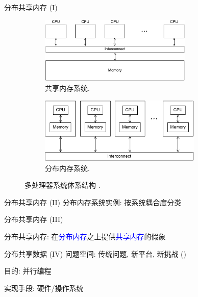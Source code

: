 \begin{frame}{分布共享内存 (I)}
  \begin{figure}
    \begin{subfigure}{0.50\linewidth}
      \centering
      \includegraphics[width=0.80\textwidth]{figures/shared-memory.png}
      \caption{共享内存系统.}
    \end{subfigure}%
    \begin{subfigure}{0.50\linewidth}
      \centering
      \includegraphics[width=0.85\textwidth]{figures/distributed-memory.png}
      \caption{分布内存系统.}
    \end{subfigure}
    \caption{多处理器系统体系结构 .}
  \end{figure}
\end{frame}
\begin{frame}{分布共享内存 (II)}
  分布内存系统实例: 按系统耦合度分类
\end{frame}
\begin{frame}{分布共享内存 (III)}
  \begin{center}
    分布共享内存: 在\textcolor{blue}{分布内存}之上提供\textcolor{blue}{共享内存}的假象
  \end{center}

\end{frame}
\begin{frame}{分布共享数据 (IV)}
  问题空间: 传统问题, 新平台, 新挑战 ()

  目的: 并行编程

  实现手段: 硬件/操作系统

  
\end{frame}
